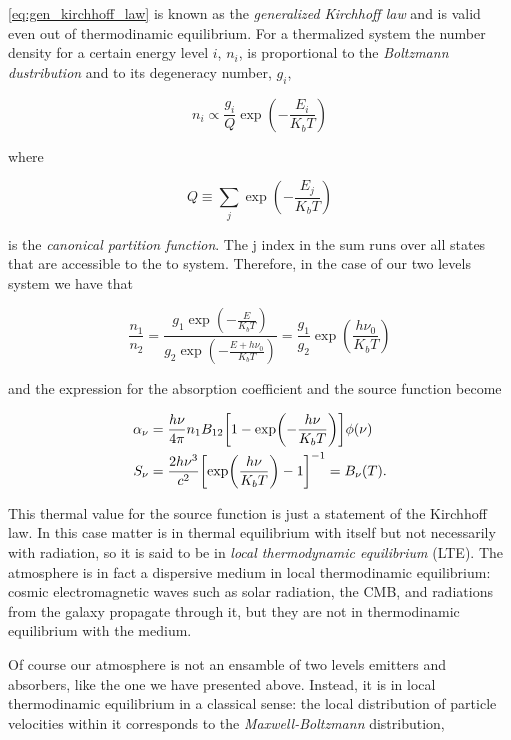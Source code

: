 \autoref{eq:gen_kirchhoff_law} is known as the \emph{generalized Kirchhoff
law} and is valid even out of thermodinamic equilibrium. For a thermalized
system the number density for a certain energy level $i$, $n_i$, is
proportional to the \emph{Boltzmann dustribution} and to its degeneracy
number, $g_i$,

\begin{equation}
        n_i \propto \frac{g_i}{Q} \exp(-\frac{E_i}{K_b T})
\end{equation}

where

\begin{equation}
        Q \equiv \sum_j \exp(-\frac{E_j}{K_b T})
\end{equation}

is the \emph{canonical partition function}. The j index in the sum runs
over all states that are accessible to the to system. Therefore, in the
case of our two levels system we have that

\begin{equation}
        \frac{n_1}{n_2} = \frac{g_1 \exp(-\frac{E}{K_b T})}{
        g_2 \exp(-\frac{E + h\nu_0}{K_b T})} =
        \frac{g_1}{g_2} \exp(\frac{h\nu_0}{K_b T})
\end{equation}

and the expression for the absorption coefficient and the source function
become

\begin{align}
        \alpha_\nu & = \frac{h\nu}{4\pi} n_1 B_{12}
        \qty[1 - \exp(-\frac{h\nu}{K_b T})]\phi\qty(\nu)\\
        S_\nu & = \frac{2h\nu^3}{c^2}\qty[\exp(\frac{h\nu}{K_b T}) - 1]^{-1}
        = B_\nu\qty(T).
\end{align}

This thermal value for the source function is just a statement of the
Kirchhoff law. In this case matter is in thermal equilibrium with
itself but not necessarily with radiation, so it is said to be in \emph{local
thermodynamic equilibrium} (LTE). The atmosphere is in fact a dispersive
medium in local thermodinamic equilibrium: cosmic electromagnetic waves
such as solar radiation, the CMB, and radiations from the galaxy propagate
through it, but they are not in thermodinamic equilibrium with the medium.

Of course our atmosphere is not an ensamble of two levels emitters and
absorbers, like the one we have presented above. Instead, it is in local
thermodinamic equilibrium in a classical sense: the local distribution of
particle velocities within it corresponds to the \emph{Maxwell-Boltzmann}
distribution,

